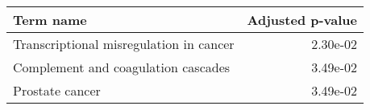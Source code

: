 \begin{tabular}{lr}
\toprule
                              Term name &  Adjusted p-value \\
\midrule
Transcriptional misregulation in cancer &          2.30e-02 \\
    Complement and coagulation cascades &          3.49e-02 \\
                        Prostate cancer &          3.49e-02 \\
\bottomrule
\end{tabular}
